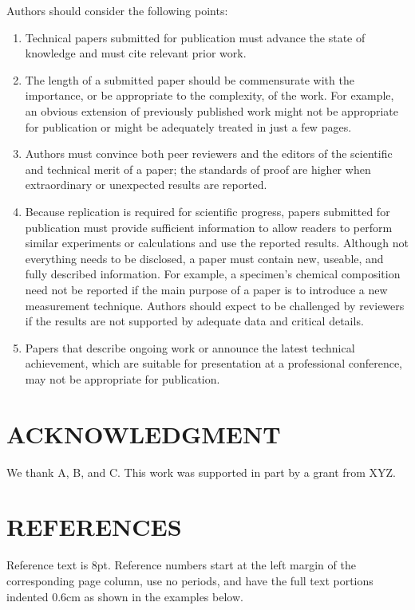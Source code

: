 \documentclass{IEEEjmw}
\begin{document}
Authors should consider the following points:
\begin{enumerate}
\item[1)]Technical papers submitted for publication must advance the state of knowledge and must cite relevant prior work. 

\item[2)]The length of a submitted paper should be commensurate with the importance, or be appropriate to the complexity, of the work. For example, an obvious extension of previously published work might not be appropriate for publication or might be adequately treated in just a few pages.

\item[3)]Authors must convince both peer reviewers and the editors of the scientific and technical merit of a paper; the standards of proof are higher when extraordinary or unexpected results are reported. 

\item[4)]Because replication is required for scientific progress, papers submitted for publication must provide sufficient information to allow readers to perform similar experiments or calculations and use the reported results. Although not everything needs to be disclosed, a paper must contain new, useable, and fully described information. For example, a specimen's chemical composition need not be reported if the main purpose of a paper is to introduce a new measurement technique. Authors should expect to be challenged by reviewers if the results are not supported by adequate data and critical details.

\item[5)]Papers that describe ongoing work or announce the latest technical achievement, which are suitable for presentation at a professional conference, may not be appropriate for publication.
\end{enumerate}

\section*{ACKNOWLEDGMENT}
We  thank  A,  B,  and  C.  This  work  was  supported  in  part  by  a grant from XYZ.


\section*{REFERENCES}
Reference text is 8pt. Reference numbers start at the left
margin of the corresponding page column, use no periods,
and have the full text portions indented 0.6cm as shown in the examples below.
\end{document}
